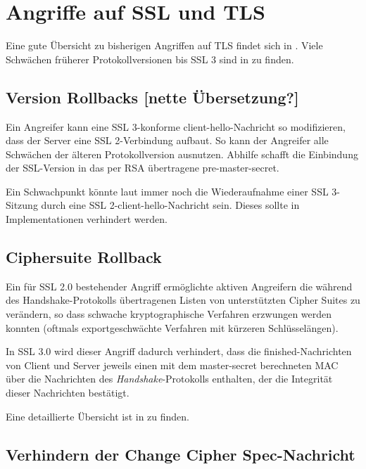 \documentclass[
    12pt,
    headings=small,
    parskip=half,           %
    bibliography=totoc,
    numbers=noenddot,       %
    open=any,               %
    ]{scrreprt}
\newcommand{\mastersecret}		{master-secret}
\newcommand{\premastersecret}		{pre-master-secret}
\newcommand{\clienthello}			{client-hello}
\newcommand{\finished}				{finished}
\newcommand{\changecipherspec}	{Change Cipher Spec}
\begin{document}
\chapter{Angriffe auf SSL und TLS}

Eine gute Übersicht zu bisherigen Angriffen auf TLS findet sich in \cite{meyer13}. Viele Schwächen früherer Protokollversionen bis SSL 3 sind in \cite{wagner96} zu finden.

\section{Version Rollbacks [nette Übersetzung?]}

Ein Angreifer kann eine SSL 3-konforme \clienthello{}-Nachricht so modifizieren, dass der Server eine SSL 2-Verbindung aufbaut. So kann der Angreifer alle Schwächen der älteren Protokollversion ausnutzen. Abhilfe schafft die Einbindung der SSL-Version in das per RSA übertragene \premastersecret. 

Ein Schwachpunkt könnte laut \cite{wagner96} immer noch die Wiederaufnahme einer SSL 3-Sitzung durch eine SSL 2-\clienthello{}-Nachricht sein. Dieses sollte in Implementationen verhindert werden.

\section{Ciphersuite Rollback}

Ein für SSL 2.0 bestehender Angriff ermöglichte aktiven Angreifern die während des Handshake-Protokolls übertragenen Listen von unterstützten Cipher Suites zu verändern, so dass schwache kryptographische Verfahren erzwungen werden konnten (oftmals exportgeschwächte Verfahren mit kürzeren Schlüsselängen).

In SSL 3.0 wird dieser Angriff dadurch verhindert, dass die \finished{}-Nachrichten von Client und Server jeweils einen mit dem \mastersecret{} berechneten MAC über die Nachrichten des \emph{Handshake}-Protokolls enthalten, der die Integrität dieser Nachrichten bestätigt.

Eine detaillierte Übersicht ist in \cite{wagner96} zu finden.

\section{Verhindern der \changecipherspec{}-Nachricht}
\end{document}
